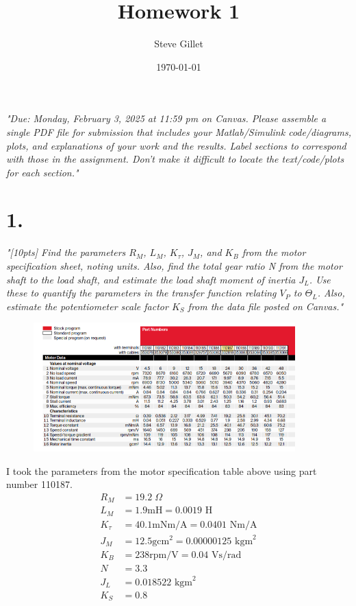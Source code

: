 \documentclass{article}
\title{Homework 1}
\author{Steve Gillet}
\date{\today}
\begin{document}
\maketitle
\textit{
    "Due: Monday, February 3, 2025 at 11:59 pm on Canvas. Please assemble a single PDF file for
    submission that includes your Matlab/Simulink code/diagrams, plots, and explanations of your
    work and the results. Label sections to correspond with those in the assignment. Don’t make it
    difficult to locate the text/code/plots for each section."
}

\section*{1.}

\textit{
    "[10pts] Find the parameters $R_M$, $L_M$, $K_\tau$, $J_M$, and $K_B$ from the motor specification sheet, noting
    units. Also, find the total gear ratio N from the motor shaft to the load shaft, and estimate the
    load shaft moment of inertia $J_L$. Use these to quantify the parameters in the transfer function
    relating $V_P$ to $\Theta_L$. Also, estimate the potentiometer scale factor $K_S$ from the data file posted on Canvas."
}

\begin{figure}[H]
    \centering
    \includegraphics[width=0.9\textwidth]{motorSpec.png}
\end{figure}

I took the parameters from the motor specification table above using part number 110187.
\begin{align*}
    R_M&=19.2\;\Omega \\
    L_M&=1.9\text{mH}=0.0019\text{ H} \\
    K_\tau&=40.1\text{mNm/A}=0.0401\text{ Nm/A}  \\
    J_M&=12.5\text{gcm}^2=0.00000125\text{ kgm}^2 \\
    K_B&=238\text{rpm/V}=0.04\text{ Vs/rad} \\
    N&=3.3 \\
    J_L&=0.018522\text{ kgm}^2 \\
    K_S&=0.8
\end{align*}
\end{document}
